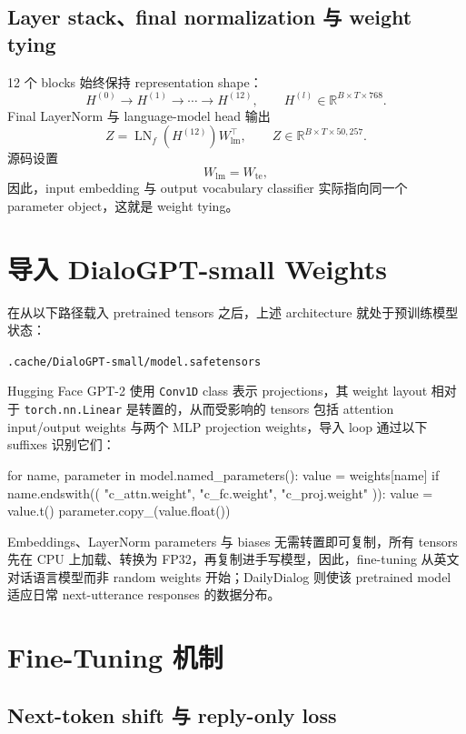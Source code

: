 \documentclass[12pt]{article}
\newcommand{\RSpace}{\mathbb R}
\begin{document}
\subsection{Layer stack、final normalization 与 weight tying}

12 个 blocks 始终保持 representation shape：
\[
H^{(0)}\rightarrow H^{(1)}\rightarrow\cdots\rightarrow H^{(12)},
\qquad H^{(l)}\in\RSpace^{B\times T\times768}.
\]
Final LayerNorm 与 language-model head 输出
\begin{equation}
Z=\operatorname{LN}_f(H^{(12)})W_{\mathrm{lm}}^\top,
\qquad Z\in\RSpace^{B\times T\times50{,}257}.
\end{equation}
源码设置
\[
W_{\mathrm{lm}}=W_{\mathrm{te}},
\]
因此，input embedding 与 output vocabulary classifier 实际指向同一个 parameter object，这就是 weight tying。

\section{导入 DialoGPT-small Weights}

在从以下路径载入 pretrained tensors 之后，上述 architecture 就处于预训练模型状态：
\begin{center}
\nolinkurl{.cache/DialoGPT-small/model.safetensors}
\end{center}


Hugging Face GPT-2 使用 \texttt{Conv1D} class 表示 projections，其 weight layout 相对于 \texttt{torch.nn.Linear} 是转置的，从而受影响的 tensors 包括 attention input/output weights 与两个 MLP projection weights，导入 loop 通过以下 suffixes 识别它们：
\begin{pythoncode}[label={lst:weight-import}]
for name, parameter in model.named_parameters():
    value = weights[name]
    if name.endswith((
        "c_attn.weight", "c_fc.weight", "c_proj.weight"
    )):
        value = value.t()
    parameter.copy_(value.float())
\end{pythoncode}
Embeddings、LayerNorm parameters 与 biases 无需转置即可复制，所有 tensors 先在 CPU 上加载、转换为 FP32，再复制进手写模型，因此，fine-tuning 从英文对话语言模型而非 random weights 开始；DailyDialog 则使该 pretrained model 适应日常 next-utterance responses 的数据分布。

\section{Fine-Tuning 机制}

\subsection{Next-token shift 与 reply-only loss}
\end{document}
